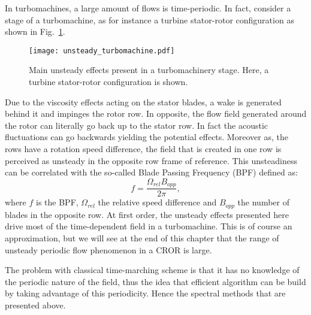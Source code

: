 In turbomachines, a large amount of flows is time-periodic.
In fact, consider a stage of a turbomachine, as for instance
a turbine stator-rotor configuration as shown 
in Fig.~\ref{fig:sm_unsteady_turbomachine}. 
\begin{figure}[htbp]
  \centering
  \texttt{[image: unsteady\_turbomachine.pdf]}
  \caption{Main unsteady effects present in a turbomachinery stage. Here, a turbine stator-rotor
  configuration is shown.}
  \label{fig:sm_unsteady_turbomachine}
\end{figure}
Due to the
viscosity effects acting on the stator blades, 
a wake is generated behind it and 
impinges the rotor row. In opposite, the flow field
generated around the rotor can literally go back up
to the stator row. In fact
the acoustic fluctuations can go backwards yielding
the potential effects. Moreover as, the rows have a 
rotation speed difference,
the field that is created in one row is perceived as unsteady in the opposite 
row frame of reference. This unsteadiness can be
correlated with the so-called Blade Passing Frequency (BPF) defined as:
\begin{equation}
	f = \frac{\Omega_{rel} B_{opp}}{2 \pi},
\end{equation}
where $f$ is the BPF, $\Omega_{rel}$ the relative speed difference 
and $B_{opp}$ the number of blades in the opposite row.
At first order, the unsteady effects presented here drive
most of the time-dependent field in a turbomachine. This 
is of course an approximation, but we will see at the end
of this chapter that the range of unsteady periodic
flow phenomenon in a CROR is large.

The problem with classical time-marching scheme is 
that it has no knowledge
of the periodic nature of the field, thus
the idea that efficient algorithm can be build by taking advantage 
of this periodicity. Hence the spectral methods that are
presented above.

